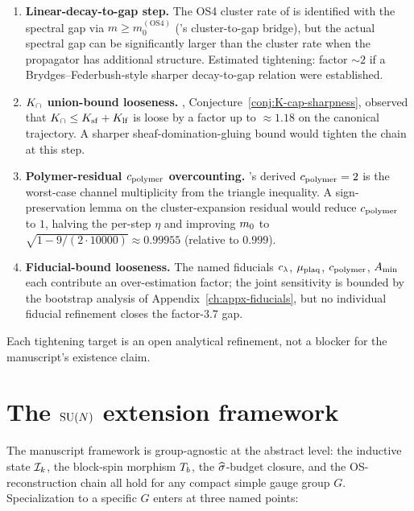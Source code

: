 \begin{enumerate}[label=(\arabic*)]
  \item \textbf{Linear-decay-to-gap step.}
    The OS4 cluster rate of  is identified with
    the spectral gap via $m \ge m_0^{(\mathrm{OS4})}$ ('s
    cluster-to-gap bridge), but the actual spectral gap can be
    significantly larger than the cluster rate when the propagator
    has additional structure.  Estimated tightening:
    factor $\sim 2$ if a Brydges--Federbush-style sharper
    decay-to-gap relation were established.
  \item \textbf{$K_{\cap}$ union-bound looseness.}
    ,
    Conjecture~\ref{conj:K-cap-sharpness}, observed that
    $K_{\cap} \le K_{\mathrm{sf}} + K_{\mathrm{lf}}$ is loose by a factor up to $\approx
    1.18$ on the canonical trajectory.  A sharper
    sheaf-domination-gluing bound would tighten the chain at this
    step.
  \item \textbf{Polymer-residual $c_{\mathrm{polymer}}$ overcounting.}
    's derived
    $c_{\mathrm{polymer}} = 2$ is the worst-case channel multiplicity from the
    triangle inequality.  A sign-preservation lemma on the
    cluster-expansion residual would reduce $c_{\mathrm{polymer}}$ to $1$,
    halving the per-step $\eta$ and improving $m_0$ to
    $\sqrt{1 - 9/(2 \cdot 10000)} \approx 0.99955$ (relative to
    $0.999$).
  \item \textbf{Fiducial-bound looseness.}
    The named fiducials $c_\lambda$, $\mu_{\mathrm{plaq}}$, $c_{\mathrm{polymer}}$, $A_{\min}$
    each contribute an over-estimation factor; the joint
    sensitivity is bounded by the bootstrap analysis of
    Appendix~\ref{ch:appx-fiducials}, but no individual fiducial
    refinement closes the factor-$3.7$ gap.
\end{enumerate}

Each tightening target is an open analytical refinement, not a
blocker for the manuscript's existence claim.

\section{The $\mathrm{SU}(N)$ extension framework}
\label{sec:su-n-extension}

%

The manuscript framework is group-agnostic at the abstract level:
the inductive state $\mathcal{I}_k$, the block-spin morphism $T_b$, the
$\widehat{\sigma}$-budget closure, and the OS-reconstruction chain all hold
for any compact simple gauge group $G$.  Specialization to a
specific $G$ enters at three named points:

